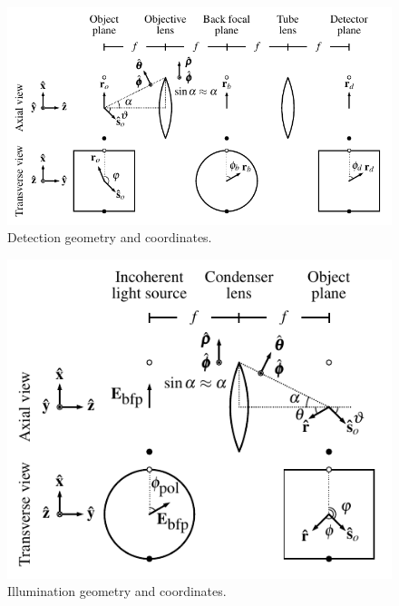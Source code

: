 \documentclass{osa-article}
\begin{document}
\begin{figure}[h]
 \centering
   \centering
   \includegraphics[scale=.9]{../figures/detection-coords/detection-coords.pdf}
   \caption{Detection geometry and coordinates.}
   \label{fig:mono}
 \end{figure}
\begin{figure}[h]
 \centering
   \centering
   \includegraphics[scale=.9]{../figures/excitation-coords/excitation-coords.pdf}
   \caption{Illumination geometry and coordinates.}
   \label{fig:microscope}
 \end{figure}
\end{document}
